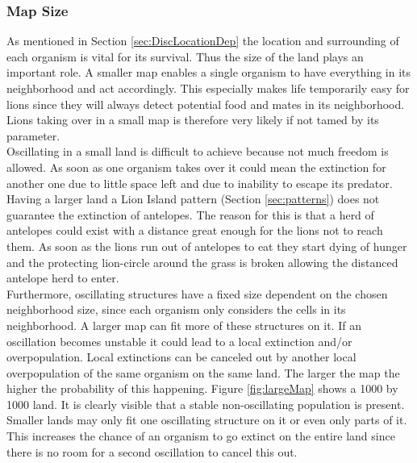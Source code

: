 \documentclass[11pt]{article}
\begin{document}
\subsubsection{Map Size}
\label{sec:DiscMapSize}
As mentioned in Section \ref{sec:DiscLocationDep} the location and surrounding of each organism is vital for its survival. Thus the size of the land plays an important role. A smaller map enables a single organism to have everything in its neighborhood and act accordingly. This especially makes life temporarily easy for lions since they will always detect potential food and mates in its neighborhood. Lions taking over in a small map is therefore very likely if not tamed by its parameter.\\
Oscillating in a small land is difficult to achieve because not much freedom is allowed. As soon as one organism takes over it could mean the extinction for another one due to little space left and due to inability to escape its predator.\\
Having a larger land a Lion Island pattern (Section \ref{sec:patterns}) does not guarantee the extinction of antelopes. The reason for this is that a herd of antelopes could exist with a distance great enough for the lions not to reach them. As soon as the lions run out of antelopes to eat they start dying of hunger and the protecting lion-circle around the grass is broken allowing the distanced antelope herd to enter.\\
Furthermore, oscillating structures have a fixed size dependent on the chosen neighborhood size, since each organism only considers the cells in its neighborhood. A larger map can fit more of these structures on it. If an oscillation becomes unstable it could lead to a local extinction and/or overpopulation. Local extinctions can be canceled out by another local overpopulation of the same organism on the same land. The larger the map the higher the probability of this happening.  Figure \ref{fig:largeMap} shows a 1000 by 1000 land. It is clearly visible that a stable non-oscillating population is present. Smaller lands may only fit one oscillating structure on it or even only parts of it. This increases the chance of an organism to go extinct on the entire land since there is no room for a second oscillation to cancel this out.\\
\end{document}
